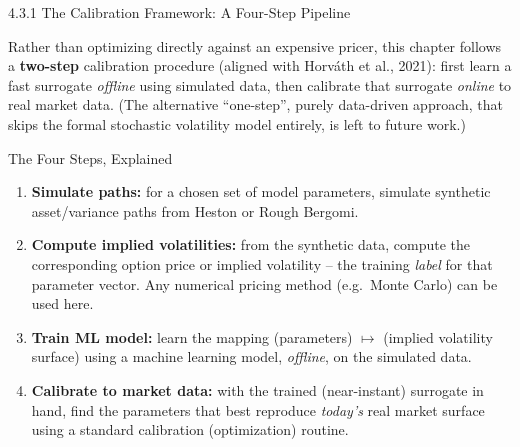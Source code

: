 \documentclass[aspectratio=169,10pt]{beamer}
\begin{document}
\begin{frame}{4.3.1 The Calibration Framework: A Four-Step Pipeline}

Rather than optimizing directly against an expensive pricer, this chapter
follows a \textbf{two-step} calibration procedure (aligned with Horv\'ath
et al., 2021): first learn a fast surrogate \emph{offline} using
simulated data, then calibrate that surrogate \emph{online} to real market
data. (The alternative ``one-step'', purely data-driven approach, that
skips the formal stochastic volatility model entirely, is left to future
work.)

\begin{center}
\end{center}

\begin{block}{The Four Steps, Explained}
\begin{enumerate}
  \item \textbf{Simulate paths:} for a chosen set of model parameters,
        simulate synthetic asset/variance paths from Heston or Rough
        Bergomi.
  \item \textbf{Compute implied volatilities:} from the synthetic data,
        compute the corresponding option price or implied volatility --
        the training \emph{label} for that parameter vector. Any
        numerical pricing method (e.g.\ Monte Carlo) can be used here.
  \item \textbf{Train ML model:} learn the mapping
        (parameters) $\mapsto$ (implied volatility surface) using a
        machine learning model, \emph{offline}, on the simulated data.
  \item \textbf{Calibrate to market data:} with the trained (near-instant)
        surrogate in hand, find the parameters that best reproduce
        \emph{today's} real market surface using a standard calibration
        (optimization) routine.
\end{enumerate}
\end{block}
\end{frame}
\end{document}

